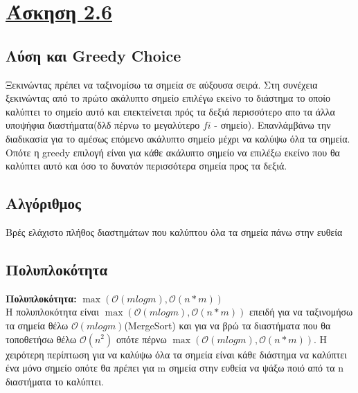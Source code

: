 \documentclass[12pt]{article}
\begin{document}
\section{\underline{Άσκηση 2.6}}
\subsection{Λύση και Greedy Choice}
Ξεκινώντας πρέπει να ταξινομίσω τα σημεία σε αύξουσα σειρά. Στη συνέχεια ξεκινώντας από το πρώτο ακάλυπτο σημείο επιλέγω εκείνο το διάστημα το οποίο καλύπτει το σημείο αυτό και επεκτείνεται πρός τα δεξιά περισσότερο απο τα άλλα υποψήφια διαστήματα(δλδ πέρνω το μεγαλύτερο $fi$ - σημείο). Επανλάμβάνω την διαδικασία για το αμέσως επόμενο ακάλυπτο σημείο μέχρι να καλύψω όλα τα σημεία. Οπότε η greedy επιλογή είναι για κάθε ακάλυπτο σημείο να επιλέξω εκείνο που θα καλύπτει αυτό και όσο το δυνατόν περισσότερα σημεία προς τα δεξιά.\\


\subsection{Αλγόριθμος}
\begin{algorithm}[H]
	\SetAlgoLined\DontPrintSemicolon
	\setcounter{AlgoLine}{0}
	\caption{Βρές ελάχιστο πλήθος διαστημάτων που καλύπτου όλα τα σημεία πάνω στην ευθεία}
\end{algorithm} 


\subsection{Πολυπλοκότητα}
\textbf{Πολυπλοκότητα:} $\max{(\mathcal{O}(mlogm),\mathcal{O}(n*m)) }$\\
Η πολυπλοκότητα είναι $\max{(\mathcal{O}(mlogm),\mathcal{O}(n*m)) }$ επειδή για να ταξινομήσω τα σημεία θέλω $\mathcal{O}(mlogm)$(MergeSort) και για να βρώ τα διαστήματα που θα τοποθετήσω θέλω $\mathcal{O}(n^2)$ οπότε πέρνω $\max{(\mathcal{O}(mlogm),\mathcal{O}(n*m)) }$.
Η χειρότερη περίπτωση για να καλύψω όλα τα σημεία είναι κάθε διάστημα να καλύπτει ένα μόνο σημείο οπότε θα πρέπει για  m σημεία στην ευθεία να ψάξω ποιό από τα n διαστήματα το καλύπτει.\\
\end{document}
